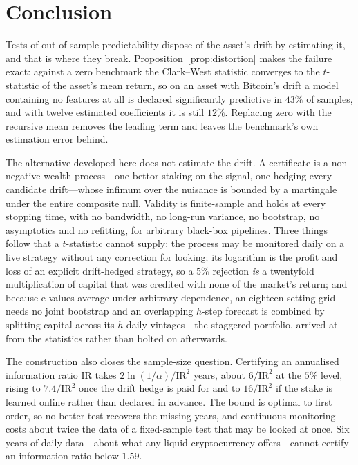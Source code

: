 \documentclass{article}
\theoremstyle{plain}
\theoremstyle{definition}
\begin{document}
\section{Conclusion}

Tests of out-of-sample predictability dispose of the asset's drift by estimating it, and
that is where they break. Proposition~\ref{prop:distortion} makes the failure exact: against
a zero benchmark the Clark--West statistic converges to the $t$-statistic of the asset's mean
return, so on an asset with Bitcoin's drift a model containing no features at all is declared
significantly predictive in $43\%$ of samples, and with twelve estimated coefficients it is
still $12\%$. Replacing zero with the recursive mean removes the leading term and leaves the
benchmark's own estimation error behind.

The alternative developed here does not estimate the drift. A certificate is a non-negative
wealth process---one bettor staking on the signal, one hedging every candidate drift---whose
infimum over the nuisance is bounded by a martingale under the entire composite null.
Validity is finite-sample and holds at every stopping time, with no bandwidth, no long-run
variance, no bootstrap, no asymptotics and no refitting, for arbitrary black-box pipelines.
Three things follow that a $t$-statistic cannot supply: the process may be monitored daily on
a live strategy without any correction for looking; its logarithm is the profit and loss of
an explicit drift-hedged strategy, so a $5\%$ rejection \emph{is} a twentyfold multiplication
of capital that was credited with none of the market's return; and because e-values average
under arbitrary dependence, an eighteen-setting grid needs no joint bootstrap and an
overlapping $h$-step forecast is combined by splitting capital across its $h$ daily
vintages---the staggered portfolio, arrived at from the statistics rather than bolted on
afterwards.

The construction also closes the sample-size question. Certifying an annualised information
ratio $\mathrm{IR}$ takes $2\ln(1/\alpha)/\mathrm{IR}^2$ years, about $6/\mathrm{IR}^2$ at
the $5\%$ level, rising to $7.4/\mathrm{IR}^2$ once the drift hedge is paid for and to
$16/\mathrm{IR}^2$ if the stake is learned online rather than declared in advance. The bound
is optimal to first order, so no better test recovers the missing years, and continuous
monitoring costs about twice the data of a fixed-sample test that may be looked at once. Six years of daily data---about what any liquid cryptocurrency offers---cannot certify
an information ratio below $1.59$.
\end{document}
